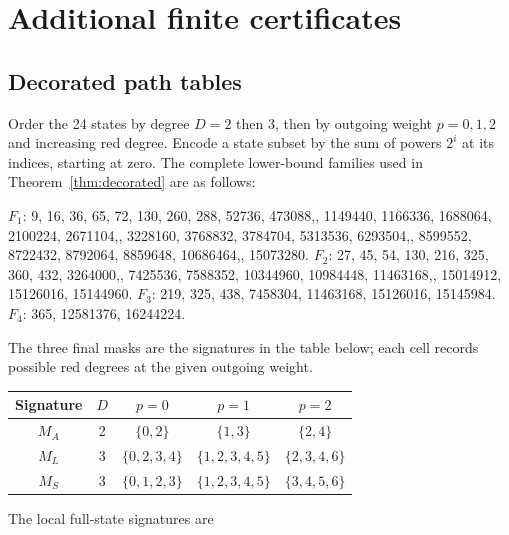 \section{Additional finite certificates}\label{app:additional}

\subsection{Decorated path tables}\label{app:decorated}

Order the 24 states by degree $D=2$ then 3, then by outgoing
weight $p=0,1,2$ and increasing red degree. Encode a state subset
by the sum of powers $2^i$ at its indices, starting at zero. The
complete lower-bound families used in Theorem~\ref{thm:decorated}
are as follows:
\begin{flushleft}\small\ttfamily
$F_1$: 9, 16, 36, 65, 72, 130, 260, 288, 52736, 473088,, 1149440, 1166336, 1688064, 2100224, 2671104,, 3228160, 3768832, 3784704, 5313536, 6293504,, 8599552, 8722432, 8792064, 8859648, 10686464,, 15073280.\medskip\newline
$F_2$: 27, 45, 54, 130, 216, 325, 360, 432, 3264000,, 7425536, 7588352, 10344960, 10984448, 11463168,, 15014912, 15126016, 15144960.\medskip\newline
$F_3$: 219, 325, 438, 7458304, 11463168, 15126016, 15145984.\medskip\newline
$F_4$: 365, 12581376, 16244224.
\end{flushleft}
The three final masks are the signatures in the table below; each
cell records possible red degrees at the given outgoing weight.
\begin{center}\small
\begin{tabular}{ccccc}\toprule
Signature&$D$&$p=0$&$p=1$&$p=2$\\\midrule
$M_A$&2&$\{0,2\}$&$\{1,3\}$&$\{2,4\}$\\
$M_L$&3&$\{0,2,3,4\}$&$\{1,2,3,4,5\}$&$\{2,3,4,6\}$\\
$M_S$&3&$\{0,1,2,3\}$&$\{1,2,3,4,5\}$&$\{3,4,5,6\}$\\\bottomrule
\end{tabular}
\end{center}
The local full-state signatures are
